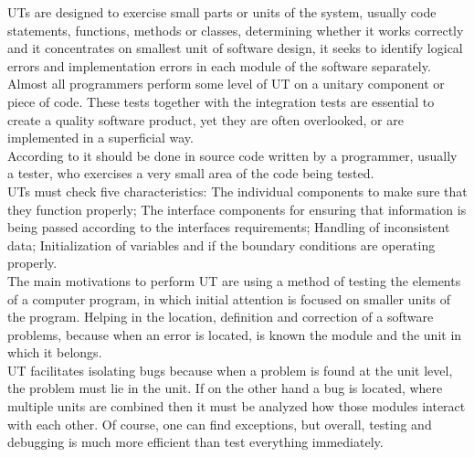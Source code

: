 {\ac{UT}s are designed to exercise small parts or units of the system, usually code statements, functions, methods or classes,
determining whether it works correctly and it concentrates on smallest unit of software design, it seeks to identify logical errors
and implementation errors in each module of the software separately.
Almost all programmers perform some level of \ac{UT} on a unitary component or piece of code.
These tests together with the integration tests are essential to create a quality software product\cite{dustin2002effective},
yet they are often overlooked, or are implemented in a superficial way.\\
According to \cite{Hunt:2003:PUT:1197403} it should be done in source code written by a programmer, usually a tester,
who exercises a very small area of the code being tested.\\
\ac{UT}s must check five characteristics: The individual components to make sure that they function properly;
The interface components for ensuring that information is being passed according to the interfaces requirements;
Handling of inconsistent data; Initialization of variables and if the boundary conditions are operating properly.\\
The main motivations to perform \ac{UT} are using a method of testing the elements of a computer program,
in which initial attention is focused on smaller units of the program. Helping in the location, definition and correction of a software problems,
because when an error is located, is known the module and the unit in which it belongs\cite{Myers:2004:AST:983238}.\\
\ac{UT} facilitates isolating bugs because when a problem is found at the unit level, the problem must lie in the unit.
If on the other hand a bug is located, where multiple units are combined then it must be analyzed how those modules interact with each other.
Of course, one can find exceptions, but overall, testing and debugging is much more efficient than test everything immediately\cite{Patton:2000:ST:517489}.\\

}
